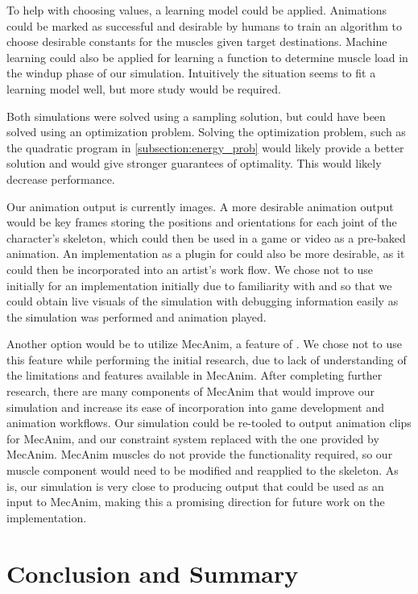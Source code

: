 To help with choosing values, a learning model could be applied.  Animations could be marked as successful and desirable by humans to train an algorithm to choose desirable constants for the muscles given target destinations.  Machine learning could also be applied for learning a function to determine muscle load in the windup phase of our simulation.  Intuitively the situation seems to fit a learning model well, but more study would be required.

Both simulations were solved using a sampling solution, but could have been solved using an optimization problem.  Solving the optimization problem, such as the quadratic program in \ref{subsection:energy_prob} would likely provide a better solution and would give stronger guarantees of optimality.  This would likely decrease performance.

Our animation output is currently images.  A more desirable animation output would be key frames storing the positions and orientations for each joint of the character's skeleton, which could then be used in a game or video as a pre-baked animation.  An implementation as a plugin for \maya{} could also be more desirable, as it could then be incorporated into an artist's work flow.  We chose not to use \maya{} initially for an implementation initially due to familiarity with \unity{} and so that we could obtain live visuals of the simulation with debugging information easily as the simulation was performed and animation played.

Another option would be to utilize MecAnim, a feature of \unity{}.  We chose not to use this feature while performing the initial research, due to lack of understanding of the limitations and features available in MecAnim.  After completing further research, there are many components of MecAnim that would improve our simulation and increase its ease of incorporation into game development and animation workflows.  Our simulation could be re-tooled to output animation clips for MecAnim, and our constraint system replaced with the one provided by MecAnim.  MecAnim muscles do not provide the functionality required, so our muscle component would need to be modified and reapplied to the skeleton.  As is, our simulation is very close to producing output that could be used as an input to MecAnim, making this a promising direction for future work on the implementation.

\section{Conclusion and Summary}
\label{section:conclusion}

